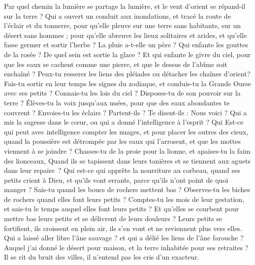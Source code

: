 \begin{multicols}{2}
{Par quel chemin la lumière se partage la lumière, et le vent d'orient se répand-il sur la terre ?
Qui a ouvert un conduit aux inondations, et tracé la route de l'éclair et du tonnerre,
pour qu'elle pleuve sur une terre sans habitants, sur un désert sans hommes ;
pour qu'elle abreuve les lieux solitaires et arides, et qu'elle fasse germer et sortir l'herbe ?
La pluie a-t-elle un père ? Qui enfante les gouttes de la rosée ?
De quel sein est sortie la glace ? Et qui enfante le givre du ciel,
pour que les eaux se cachent comme une pierre, et que le dessus de l'abîme soit enchaîné ?
Peux-tu resserer les liens des pléiades ou détacher les chaînes d'orient?
Fais-tu sortir en leur temps les signes du zodiaque, et conduis-tu la Grande Ourse avec ses petits ?
Connais-tu les lois du ciel ? Disposes-tu de son pouvoir sur la terre ?
Élèves-tu la voix jusqu'aux nuées, pour que des eaux abondantes te couvrent ?
Envoies-tu les éclairs ? Partent-ils ? Te disent-ils : Nous voici ?
Qui a mis la sagesse dans le cœur, ou qui a donné l'intelligence à l'esprit ?
Qui Est-ce qui peut avec intelligence compter les nuages, et pour placer les outres des cieux,
quand la poussière est détrompée par les eaux qui l'arrosent, et que les mottes viennent à se joindre ?
\VerseOne{}Chasses-tu de la proie pour la lionne, et apaises-tu la faim des lionceaux,
Quand ils se tapissent dans leurs tanières et se tiennent aux aguets dans leur repaire ?
Qui est-ce qui apprête la nourriture au corbeau, quand ses petits crient à Dieu, et qu'ils vont errants, parce qu'ils n'ont point de quoi manger ?
Sais-tu quand les boucs de rochers mettent bas ? Observes-tu les biches de rochers quand elles font leurs petits ?
Comptes-tu les mois de leur gestation, et sais-tu le temps auquel elles font leurs petits ?
Et qu'elles se courbent pour mettre bas leurs petits et se délivrent de leurs douleurs ?
Leurs petits se fortifient, ils croissent en plein air, ils s’en vont et ne reviennent plus vers elles.
Qui a laissé aller libre l’âne sauvage ? et qui a délié les liens de l’âne farouche ?
Auquel j’ai donné le désert pour maison, et la terre inhabitée pour ses retraites ?
Il se rit du bruit des villes, il n'entend pas les cris d'un exacteur.
}
\end{multicols}
